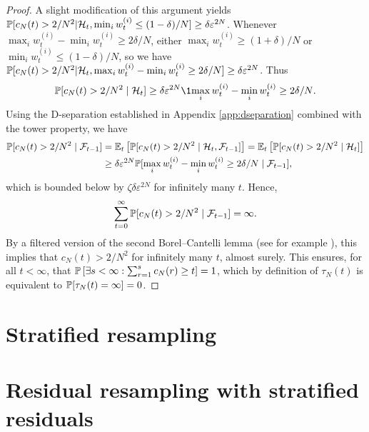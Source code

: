 \begin{proof}
A slight modification of this argument yields $\mathbb{P}[ c_N(t) > 2/N^2 | \mathcal{H}_t, \min_i w_t^{(i)} \leq (1-\delta)/N ] \geq \delta \varepsilon^{2N} $.
Whenever $\max_i w_t^{(i)} - \min_i w_t^{(i)} \geq 2\delta/N$, either $\max_i w_t^{(i)} \geq (1+\delta)/N$ or $\min_i w_t^{(i)} \leq (1-\delta)/N$, so we have 
$\mathbb{P}[ c_N(t) > 2/N^2 | \mathcal{H}_t, \max_i w_t^{(i)} - \min_i w_t^{(i)} \geq 2\delta/N ] \geq \delta \varepsilon^{2N}$.
Thus 
\begin{equation*}
\Prob[ c_N(t)>2/N^2 \mid \mathcal{H}_t ] \geq \delta \varepsilon^{2N}\1{\max_i w_t^{(i)} - \min_i w_t^{(i)} \geq 2\delta/N} .
\end{equation*}
Using the D-separation established in Appendix \ref{app:dseparation} combined with the tower property, we have
\begin{align*}
\mathbb{P}[ c_N(t)>2/N^2 \mid \mathcal{F}_{t-1} ]
&=\mathbb{E}_t\left[ \mathbb{P}[ c_N(t)>2/N^2 \mid \mathcal{H}_t, \mathcal{F}_{t-1} ] \right]
=\mathbb{E}_t\left[ \mathbb{P}[ c_N(t)>2/N^2 \mid \mathcal{H}_t ] \right] \\
&\geq \delta \varepsilon^{2N} \mathbb{P}[ \max_i w_t^{(i)} - \min_i w_t^{(i)} \geq 2\delta/N \mid \mathcal{F}_{t-1} ] ,
\end{align*}
which is bounded below by $ \zeta \delta \varepsilon^{2N} $ for infinitely many $t$. 
Hence,
\begin{equation*}
\sum_{t=0}^\infty \mathbb{P}[ c_N(t) > 2/N^2 \mid \mathcal{F}_{t-1} ] = \infty .
\end{equation*}
By a filtered version of the second Borel--Cantelli lemma (see for example \cite[Theorem 4.3.4]{durrett2019}), this implies that $c_N(t) >2/N^2$ for infinitely many $t$, almost surely.
This ensures, for all $t <\infty$, that $\mathbb{P}\left[ \exists s<\infty : \sum_{r=1}^s c_N(r) \geq t \right] =1$, which by definition of $\tau_N(t)$ is equivalent to $\mathbb{P}[ \tau_N(t) = \infty ] =0$.
\end{proof}


\section{Stratified resampling}

\section{Residual resampling with stratified residuals}

